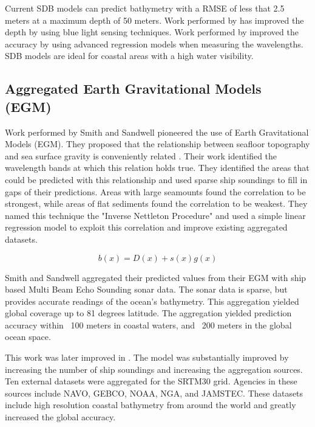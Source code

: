 \par
Current \ac{SDB} models can predict bathymetry with a \ac{RMSE} of less that 2.5 meters at a maximum depth of 50 meters.
Work performed by \cite{vinayaraj2016satellite} has improved the depth by using blue light sensing techniques.
Work performed by \cite{chybicki2018three} improved the accuracy by using advanced regression models when measuring the wavelengths.
\ac{SDB} models are ideal for coastal areas with a high water visibility.

\subsection{Aggregated Earth Gravitational Models (EGM)}
Work performed by Smith and Sandwell \cite{smith1994bathymetric}\cite{smith1997global} pioneered the use of Earth Gravitational Models (EGM).
They proposed that the relationship between seafloor topography and sea surface gravity is conveniently related \cite{smith1994bathymetric}.
Their work identified the wavelength bands at which this relation holds true.
They identified the areas that could be predicted with this relationship and used sparse ship soundings to fill in gaps of their predictions.
Areas with large seamounts found the correlation to be strongest, while areas of flat sediments found the correlation to be weakest.
They named this technique the "Inverse Nettleton Procedure" and used a simple linear regression model to exploit this correlation and improve existing aggregated datasets.

\begin{equation}
    b(x) = D(x) + s(x)g(x) \label{eq:egm}
\end{equation}

\par
Smith and Sandwell aggregated their predicted values from their \ac{EGM} with ship based Multi Beam Echo Sounding sonar data.
The sonar data is sparse, but provides accurate readings of the ocean's bathymetry.
This aggregation yielded global coverage up to 81 degrees latitude.
The aggregation yielded prediction accuracy within ~100 meters in coastal waters, and ~200 meters in the global ocean space.

\par 
This work was later improved in \cite{becker2009global}.
The model was substantially improved by increasing the number of ship soundings and increasing the aggregation sources.
Ten external datasets were aggregated for the SRTM30 grid.
Agencies in these sources include \ac{NAVO}, \ac{GEBCO}, \ac{NOAA}, \ac{NGA}, and \ac{JAMSTEC}.
These datasets include high resolution coastal bathymetry from around the world and greatly increased the global accuracy.


